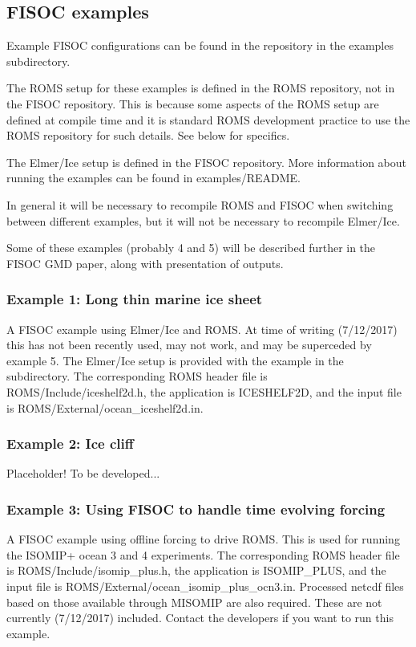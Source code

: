\documentclass[12pt]{article}
\begin{document}
\subsection{FISOC examples}

Example FISOC configurations can be found in the repository in the 
examples subdirectory. 

The ROMS setup for these examples is defined in the ROMS repository, not in the 
FISOC repository.  This is because some aspects of the ROMS setup are defined at 
compile time and it is standard ROMS development practice to use the ROMS 
repository for such details.  See below for specifics. 

The Elmer/Ice setup is defined in the FISOC 
repository.  
More information about running the examples can be found in 
examples/README.

In general it will be necessary to recompile ROMS and FISOC 
when switching between different examples, but it will not be necessary 
to recompile Elmer/Ice.

Some of these examples (probably 4 and 5) will be 
described further in the FISOC GMD paper, 
along with presentation of outputs.



\subsubsection{Example 1: Long thin marine ice sheet}
A FISOC example using Elmer/Ice and ROMS. 
At time of writing (7/12/2017) this has not been 
recently used, may not work, and may be superceded by 
example 5. 
The Elmer/Ice setup is provided with the example in the subdirectory. 
The corresponding ROMS header file is ROMS/Include/iceshelf2d.h, 
the application is ICESHELF2D, and 
the input file is ROMS/External/ocean\_iceshelf2d.in.

\subsubsection{Example 2: Ice cliff}
Placeholder!  To be developed...

\subsubsection{Example 3: Using FISOC to handle time evolving forcing}
A FISOC example using offline forcing to drive ROMS. 
This is used for running the ISOMIP+ ocean 3 and 4 experiments.
The corresponding ROMS header file is ROMS/Include/isomip\_plus.h, 
the application is ISOMIP\_PLUS, 
and the input file is ROMS/External/ocean\_isomip\_plus\_ocn3.in.
Processed netcdf files based on those available through MISOMIP 
are also required.  These are not currently (7/12/2017) 
included.  Contact the developers if you want to run this example. 
\end{document}
